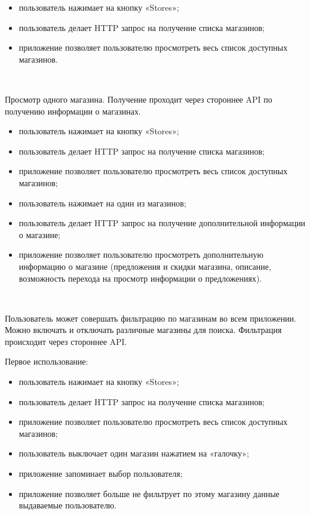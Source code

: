 \begin{itemize}
  \item пользователь нажимает на кнопку «Stores»;
  \item пользователь делает HTTP запрос на получение списка магазинов;
  \item приложение позволяет пользователю просмотреть весь список доступных магазинов.
\end{itemize}


~\par

Просмотр одного магазина. Получение проходит через стороннее API по получению информации о магазинах.

\begin{itemize}
  \item пользователь нажимает на кнопку «Stores»;
  \item пользователь делает HTTP запрос на получение списка магазинов;
  \item приложение позволяет пользователю просмотреть весь список доступных магазинов;
  \item пользователь нажимает на один из магазинов;
  \item пользователь делает HTTP запрос на получение дополнительной информации о магазине;
  \item приложение позволяет пользователю просмотреть дополнительную информацию о магазине (предложения и скидки магазина, описание, возможность перехода на просмотр информации о предложениях).
\end{itemize}

~\par

Пользователь может совершать фильтрацию по магазинам во всем приложении. Можно включать и отключать различные магазины для поиска. Фильтрация происходит через стороннее API.

Первое использование:

\begin{itemize}
  \item пользователь нажимает на кнопку «Stores»;
  \item пользователь делает HTTP запрос на получение списка магазинов;
  \item приложение позволяет пользователю просмотреть весь список доступных магазинов;
  \item пользователь выключает один магазин нажатием на «галочку»;
  \item приложение запоминает выбор пользователя;
  \item приложение позволяет больше не фильтрует по этому магазину данные выдаваемые пользователю.
\end{itemize}

